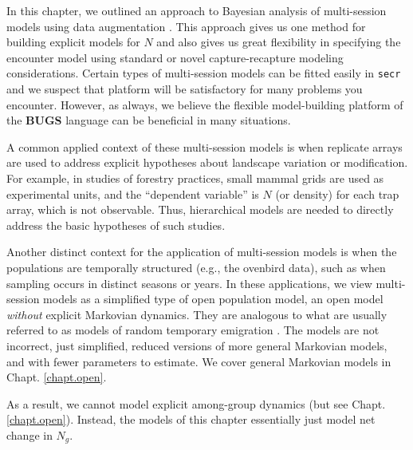 In this chapter, we outlined an approach to Bayesian analysis of
multi-session models using data augmentation
\citet{converse_royle:2012, royle_converse:2013}.  This
approach gives us one method for building explicit models for $N$
and also gives us
great flexibility in specifying the encounter model using standard or
novel capture-recapture modeling considerations. Certain types of
multi-session models can be fitted easily in \mbox{\tt secr} and we
suspect that platform will be satisfactory for many problems you
encounter. However, as always, we believe the flexible model-building
platform of the {\bf BUGS} language can be beneficial in many
situations. 

A common applied context of these multi-session models is when
replicate arrays are used to address explicit hypotheses about
landscape variation or modification. For example, in studies of
forestry practices, small mammal grids are used as experimental units,
and the ``dependent variable'' is $N$ (or density) for each trap
array, which is not observable.  Thus, hierarchical models are needed
to directly address the basic hypotheses of such studies.  

Another
distinct context for the application of multi-session models is when
the populations are temporally structured (e.g., the ovenbird data),
such as when sampling occurs in distinct seasons or years. 
In these applications, we
view multi-session models as a simplified type of open population
model, an open model {\it without} explicit Markovian dynamics. They
are analogous to what are usually referred to as models of random
temporary emigration \citep{kendall_etal:1997, chandler_etal:2011}.
The models are not incorrect, just simplified, reduced versions of
more general Markovian models, and with fewer parameters to estimate.
We cover general Markovian models in Chapt. \ref{chapt.open}.

 As a result, we cannot
model explicit among-group dynamics
(but see Chapt. 
\ref{chapt.open}). Instead, the models of this chapter essentially
just model net change in $N_{g}$.
